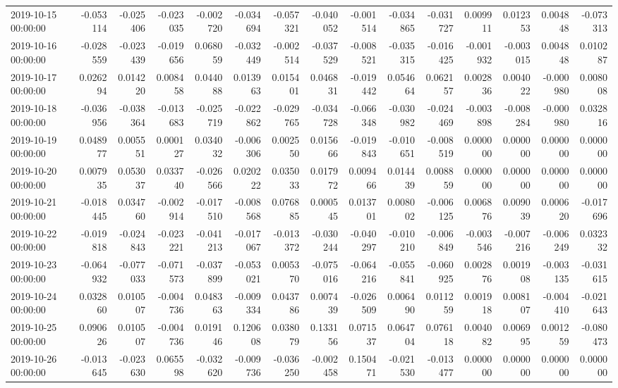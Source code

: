 \begin{tabular}{lrrrrrrrrrrrrrr}
2019-10-15 00:00:00 & -0.053114 & -0.025406 & -0.023035 & -0.002720 & -0.034694 & -0.057321 & -0.040052 & -0.001514 & -0.034865 & -0.031727 & 0.009911 & 0.012353 & 0.004848 & -0.073313 \\
2019-10-16 00:00:00 & -0.028559 & -0.023439 & -0.019656 & 0.068059 & -0.032449 & -0.002514 & -0.037529 & -0.008521 & -0.035315 & -0.016425 & -0.001932 & -0.003015 & 0.004848 & 0.010287 \\
2019-10-17 00:00:00 & 0.026294 & 0.014220 & 0.008458 & 0.044088 & 0.013963 & 0.015401 & 0.046831 & -0.019442 & 0.054664 & 0.062157 & 0.002836 & 0.004022 & -0.000980 & 0.008008 \\
2019-10-18 00:00:00 & -0.036956 & -0.038364 & -0.013683 & -0.025719 & -0.022862 & -0.029765 & -0.034728 & -0.066348 & -0.030982 & -0.024469 & -0.003898 & -0.008284 & -0.000980 & 0.032816 \\
2019-10-19 00:00:00 & 0.048977 & 0.005551 & 0.000127 & 0.034032 & -0.006306 & 0.002550 & 0.015666 & -0.019843 & -0.010651 & -0.008519 & 0.000000 & 0.000000 & 0.000000 & 0.000000 \\
2019-10-20 00:00:00 & 0.007935 & 0.053037 & 0.033740 & -0.026566 & 0.020222 & 0.035033 & 0.017972 & 0.009466 & 0.014439 & 0.008859 & 0.000000 & 0.000000 & 0.000000 & 0.000000 \\
2019-10-21 00:00:00 & -0.018445 & 0.034760 & -0.002914 & -0.017510 & -0.008568 & 0.076885 & 0.000545 & 0.013701 & 0.008002 & -0.006125 & 0.006876 & 0.009039 & 0.000620 & -0.017696 \\
2019-10-22 00:00:00 & -0.019818 & -0.024843 & -0.023221 & -0.041213 & -0.017067 & -0.013372 & -0.030244 & -0.040297 & -0.010210 & -0.006849 & -0.003546 & -0.007216 & -0.006249 & 0.032332 \\
2019-10-23 00:00:00 & -0.064932 & -0.077033 & -0.071573 & -0.037899 & -0.053021 & 0.005370 & -0.075016 & -0.064216 & -0.055841 & -0.060925 & 0.002876 & 0.001908 & -0.003135 & -0.031615 \\
2019-10-24 00:00:00 & 0.032860 & 0.010507 & -0.004736 & 0.048363 & -0.009334 & 0.043786 & 0.007439 & -0.026509 & 0.006490 & 0.011259 & 0.001918 & 0.008107 & -0.004410 & -0.021643 \\
2019-10-25 00:00:00 & 0.090626 & 0.010507 & -0.004736 & 0.019146 & 0.120608 & 0.038079 & 0.133156 & 0.071537 & 0.064704 & 0.076118 & 0.004082 & 0.006995 & 0.001259 & -0.080473 \\
2019-10-26 00:00:00 & -0.013645 & -0.023630 & 0.065598 & -0.032620 & -0.009736 & -0.036250 & -0.002458 & 0.150471 & -0.021530 & -0.013477 & 0.000000 & 0.000000 & 0.000000 & 0.000000 \\

\end{tabular}
